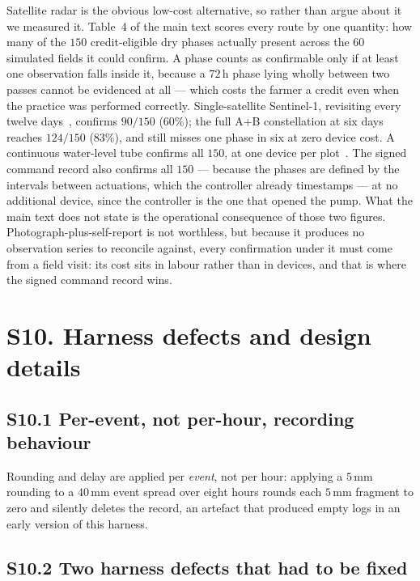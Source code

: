 Satellite radar is the obvious low-cost alternative, so rather than argue about it
we measured it. Table~4 of the main text scores every route by one quantity: how
many of the $150$ credit-eligible dry phases actually present across the $60$
simulated fields it could confirm. A phase counts as confirmable only if at least
one observation falls inside it, because a $72$\,h phase lying wholly between two
passes cannot be evidenced at all --- which costs the farmer a credit even when
the practice was performed correctly. Single-satellite Sentinel-1, revisiting every
twelve days~\cite{clauss2017s1}, confirms $90/150$ ($60\%$); the full A+B
constellation at six days~\cite{hashemi2022s1} reaches $124/150$ ($83\%$), and
still misses one phase in six at zero device cost. A continuous water-level tube
confirms all $150$, at one device per plot~\cite{delacruz2022}. The signed command
record also confirms all $150$ --- because the phases are defined by the intervals
between actuations, which the controller already timestamps --- at no additional
device, since the controller is the one that opened the pump.
What the main text does not state is the operational consequence of those two
figures. Photograph-plus-self-report is not worthless, but because it produces no
observation series to reconcile against, every confirmation under it must come
from a field visit: its cost sits in labour rather than in devices, and that is
where the signed command record wins.

\section*{S10. Harness defects and design details}

\subsection*{S10.1 Per-event, not per-hour, recording behaviour}

Rounding and delay are applied per \emph{event}, not per hour: applying a
$5$\,mm rounding to a $40$\,mm event spread over eight hours rounds each
$5$\,mm fragment to zero and silently deletes the record, an artefact that
produced empty logs in an early version of this harness.

\subsection*{S10.2 Two harness defects that had to be fixed}

